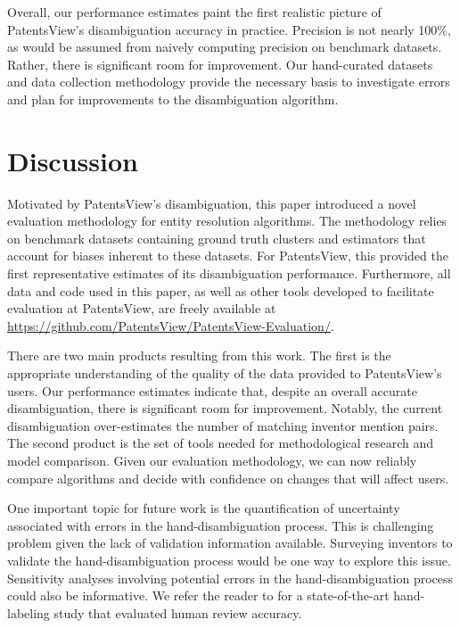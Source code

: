 \documentclass[fontsize=11pt]{article}
\newcommand{\ob}[1]{{#1}}
\theoremstyle{definition}
\begin{document}
Overall, our performance estimates paint the first realistic picture of PatentsView's disambiguation accuracy in practice. Precision is not nearly 100\%, as would be assumed from naively computing precision on benchmark datasets. Rather, there is significant room for improvement. Our hand-curated datasets and data collection methodology provide the necessary basis to investigate errors and plan for improvements to the disambiguation algorithm.

\section{Discussion}\label{sec:discussion}

Motivated by PatentsView's disambiguation, this paper introduced a novel evaluation methodology for entity resolution algorithms. The methodology relies on benchmark datasets containing ground truth clusters and estimators that account for biases inherent to these datasets. For PatentsView, this provided the first representative estimates of its disambiguation performance. Furthermore, all data and code used in this paper, as well as other tools developed to facilitate evaluation at PatentsView, are freely available at \hyperref[https://github.com/PatentsView/PatentsView-Evaluation/]{https://github.com/PatentsView/PatentsView-Evaluation/}.

There are two main products resulting from this work. The first is the appropriate understanding of the quality of the data provided to PatentsView's users. Our performance estimates indicate that, despite an overall accurate disambiguation, there is significant room for \ob{improvement. Notably, the current disambiguation over-estimates the number of matching inventor mention pairs.} The second product is the set of tools needed for methodological research and model comparison. Given our evaluation methodology, we can now reliably compare algorithms and decide with confidence on changes that will affect users.

{One important topic for future work is the quantification of uncertainty associated with errors in the hand-disambiguation process. This is challenging problem given the lack of validation information available. Surveying inventors to validate the hand-disambiguation process would be one way to explore this issue. Sensitivity analyses involving potential errors in the hand-disambiguation process could also be informative. We refer the reader to \cite{bailey2017well} for a state-of-the-art hand-labeling study that evaluated human review accuracy.}
\end{document}
